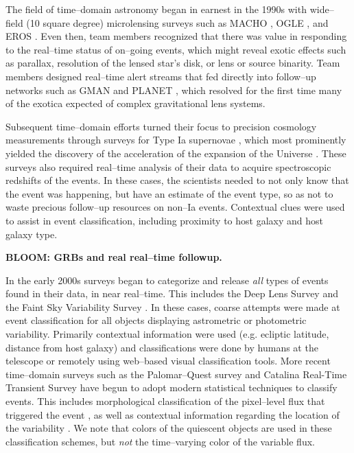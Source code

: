  \smallskip

The field of time--domain astronomy began in earnest in the 1990s with
wide--field (10 square degree) microlensing surveys such as MACHO
\citep{2000ApJ...542..281A}, OGLE \citep{1994AcA....44..227U}, and EROS
\citep{2003A&A...400..951A}.   Even then, team members recognized that there was
value in responding to the real--time status of on--going events, which might
reveal exotic effects such as parallax, resolution of the lensed star's disk, or
lens or source binarity.  Team members designed real--time alert streams that
fed directly into follow--up networks such as GMAN \citep{2000PhDT.......258B}
and PLANET \citep{1998ApJ...509..687A}, which resolved for the first time many
of the exotica expected of complex gravitational lens systems.

Subsequent time--domain efforts turned their focus to precision cosmology
measurements through surveys for Type Ia supernovae \citep{1996AJ....112.2398H},
which most prominently yielded the discovery of the acceleration of the
expansion of the Universe \citep{1998AJ....116.1009R,1999ApJ...517..565P}. These
surveys also required real--time analysis of their data to acquire spectroscopic
redshifts of the events. In these cases, the scientists needed to not only know
that the event was happening, but have an estimate of the event type, so as not
to waste precious follow--up resources on non--Ia events.  Contextual clues were
used to assist in event classification, including proximity to host galaxy and
host galaxy type.

{\bf BLOOM: GRBs and real real--time followup.}

In the early 2000s surveys began to categorize and release {\it all} types of
events found in their data, in near real--time. This includes the Deep Lens
Survey \citep{Becker04a} and the Faint Sky Variability Survey
\citep{2003MNRAS.339..427G}.  In these cases, coarse attempts were made at event
classification for all objects displaying astrometric or photometric
variability. Primarily contextual information were used (e.g. ecliptic latitude,
distance from host galaxy) and classifications were done by humans at the
telescope or remotely using web--based visual classification tools.  More recent
time--domain surveys such as the Palomar--Quest survey
\citep{2008AN....329..263D} and Catalina Real-Time Transient Survey
\citep{2011arXiv1102.5004D} have begun to adopt modern statistical techniques to
classify events.  This includes morphological classification of the pixel--level
flux that triggered the event \citep{2008AIPC.1082..252D}, as well as contextual
information regarding the location of the variability
\citep{2010ASPC..434..115M}.  We note that colors of the quiescent objects are
used in these classification schemes, but {\it not} the time--varying color of
the variable flux.

